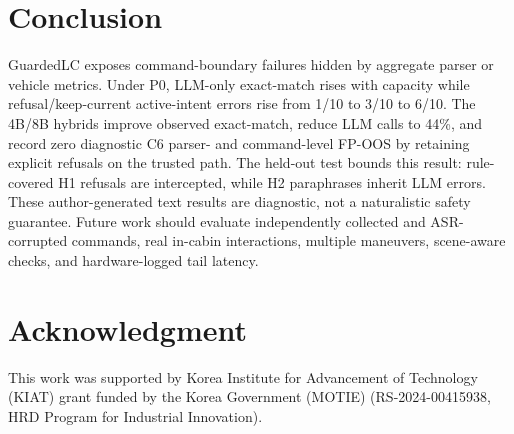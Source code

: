 \documentclass[conference]{IEEEtran}
\newcommand{\ours}{GuardedLC}
\begin{document}
\balance
\section{Conclusion}
\ours{} exposes command-boundary failures hidden by aggregate parser or vehicle metrics. Under P0, LLM-only exact-match rises with capacity while refusal/keep-current active-intent errors rise from 1/10 to 3/10 to 6/10. The 4B/8B hybrids improve observed exact-match, reduce LLM calls to 44\%, and record zero diagnostic C6 parser- and command-level FP-OOS by retaining explicit refusals on the trusted path. The held-out test bounds this result: rule-covered H1 refusals are intercepted, while H2 paraphrases inherit LLM errors. These author-generated text results are diagnostic, not a naturalistic safety guarantee. Future work should evaluate independently collected and ASR-corrupted commands, real in-cabin interactions, multiple maneuvers, scene-aware checks, and hardware-logged tail latency.

\section*{Acknowledgment}
This work was supported by Korea Institute for Advancement of Technology (KIAT) grant funded by the Korea Government (MOTIE) (RS-2024-00415938, HRD Program for Industrial Innovation).
\end{document}
